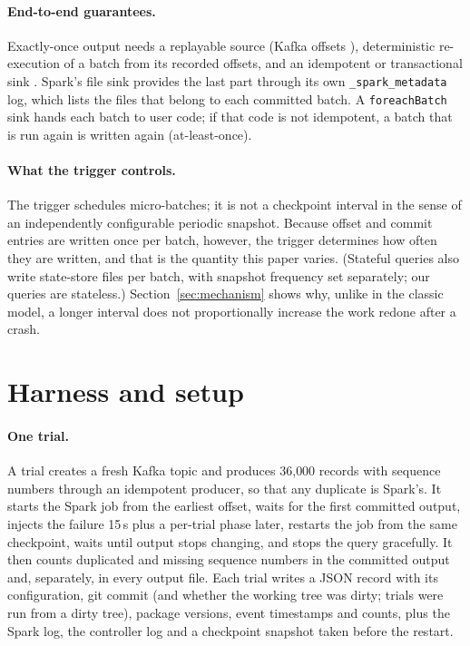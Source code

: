 \documentclass[10pt,twocolumn]{article}
\begin{document}
\paragraph{End-to-end guarantees.}
Exactly-once output needs a replayable source (Kafka offsets
\cite{kreps2011kafka}), deterministic re-execution of a batch from its recorded
offsets, and an idempotent or transactional sink \cite{sparkguide}. Spark's file
sink provides the last part through its own \texttt{\_spark\_metadata} log,
which lists the files that belong to each committed batch. A
\texttt{foreachBatch} sink hands each batch to user code; if that code is not
idempotent, a batch that is run again is written again (at-least-once).

\paragraph{What the trigger controls.}
The trigger schedules micro-batches; it is not a checkpoint interval in the
sense of an independently configurable periodic snapshot. Because offset and
commit entries are written once per batch, however, the trigger determines how
often they are written, and that is the quantity this paper varies. (Stateful
queries also write state-store files per batch, with snapshot frequency set
separately; our queries are stateless.) Section~\ref{sec:mechanism} shows why,
unlike in the classic model, a longer interval does not proportionally increase
the work redone after a crash.

\section{Harness and setup}
\label{sec:harness}

\paragraph{One trial.}
A trial creates a fresh Kafka topic and produces 36{,}000 records with
sequence numbers through an idempotent producer, so that any duplicate is
Spark's. It starts the Spark job from the earliest offset, waits for the first
committed output, injects the failure 15\,s plus a per-trial phase later,
restarts the job from the same checkpoint, waits until output stops changing,
and stops the query gracefully. It then counts duplicated and missing sequence
numbers in the committed output and, separately, in every output file. Each
trial writes a JSON record with its configuration, git commit (and whether the
working tree was dirty; \DirtyTrials{} trials were run from a dirty tree),
package versions, event timestamps and counts, plus the Spark log, the
controller log and a checkpoint snapshot taken before the restart.
\end{document}
